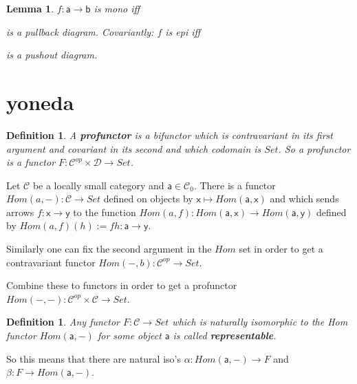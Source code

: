 \documentclass{article}
\newcommand{\cat}[1]{\mathcal{#1}} %
\newcommand{\cato}[1]{\cat{#1}_0} %
\newcommand{\ob}[1]{\mathsf{#1}} %
\newcommand{\catop}[1]{\cat{#1}^{op}}
\newtheorem{lemma}[theorem]{Lemma}
\newtheorem{definition}[theorem]{Definition}
\begin{document}
\begin{lemma}
	$f: \ob{a} \rightarrow \ob{b}$ is mono iff
	is a pullback diagram.
	Covariantly: $f$ is epi iff
	 is a pushout diagram.
\end{lemma}



\section{yoneda}

\begin{definition}
	A \textbf{profunctor} is a bifunctor which is contravariant in its first argument and covariant in its second and which codomain is $Set$.
	So a profunctor is a functor $F: \catop{C} \times \cat{D} \rightarrow Set$.
\end{definition}

Let $\cat{C}$ be a locally small category and $\ob{a} \in \cato{C}$.
There is a functor $Hom(a, -): \cat{C} \rightarrow Set$ defined on objects by $\ob{x} \mapsto Hom(\ob{a}, \ob{x})$
and which sends arrows $f: \ob{x} \rightarrow \ob{y}$ to the function $Hom(a, f): Hom(\ob{a}, \ob{x}) \rightarrow Hom(\ob{a}, \ob{y})$	defined by $Hom(a, f)(h) := fh: \ob{a} \rightarrow \ob{y}$.

Similarly one can fix the second argument in the $Hom$ set in order to get a contravariant functor $Hom(-, b): \catop{C} \rightarrow Set$.

Combine these to functors in order to get a profunctor $Hom(-, -): \catop{C} \times \cat{C} \rightarrow Set$.

\begin{definition}
	Any functor $F: \cat{C} \rightarrow Set$ which is naturally isomorphic to the Hom functor $Hom(\ob{a}, -)$ for some object $\ob{a}$ is called \textbf{representable}.
\end{definition}

So this means that there are natural iso's $\alpha: Hom(\ob{a}, -) \rightarrow F$ and $\beta: F \rightarrow Hom(\ob{a}, -)$.
\end{document}
